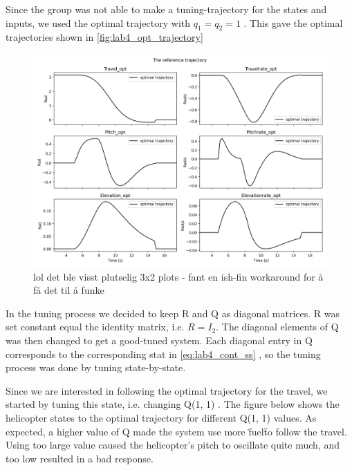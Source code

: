 \documentclass[../main.tex]{subfiles}
\begin{document}
Since the group was not able to make a tuning-trajectory for the states and inputs, we used the optimal trajectory with $q_1 = q_2 = 1$ . This gave the optimal trajectories shown in \cref{fig:lab4_opt_trajectory}

\begin{figure}[h]
	\centering
	\includegraphics[width=\linewidth]{figures/LAB4_reference_trajectory.png}
	\caption{lol det ble visst plutselig 3x2 plots - fant en ish-fin workaround for å få det til å funke}
\end{figure}

In the tuning process we decided to keep R and Q as diagonal matrices. R was set constant equal the identity matrix, i.e. $R = I_2$. The diagonal elements of Q was then changed to get a good-tuned system. Each diagonal entry in Q corresponds to the corresponding stat in \cref{eq:lab4_cont_ss} , so the tuning process was done by tuning state-by-state. 

Since we are interested in following the optimal trajectory for the travel, we started by tuning this state, i.e. changing Q(1, 1) . The figure below shows the helicopter states to the optimal trajectory for different Q(1, 1) values. As expected, a higher value of Q made the system use more \"fuel\" to follow the travel. Using too large value caused the helicopter's pitch to oscillate quite much, and too low resulted in a bad response.
\end{document}
